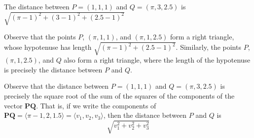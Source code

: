 \begin{example}
    The distance between $P = (1,1,1)$ and $Q = (\pi, 3, 2.5)$  is $\sqrt{(\pi-1)^2+ (3-1)^2 + (2.5-1)^2}$
    
    \begin{center}
        \end{center}

Observe that the points $P$, $(\pi, 1, 1)$, and $(\pi, 1, 2.5)$ form a right triangle, whose hypotenuse has length $\sqrt{(\pi-1)^2+(2.5-1)^2}$. Similarly, the points $P$, $(\pi, 1, 2.5)$, and $Q$ also form a right triangle, where the length of the hypotenuse is precisely the distance between $P$ and $Q$.

    
\end{example}

Observe that the distance between $P = (1,1,1)$ and $Q = (\pi, 3, 2.5)$  is precisely the square root of the sum of the squares of the components of the vector $\bm{PQ}$. That is, if we write the components of $\bm{PQ} = \langle \pi-1, 2, 1.5 \rangle = \langle v_1, v_2, v_3 \rangle$, then the distance between $P$ and $Q$ is $$\sqrt{v_1^2 + v_2^2 + v_3^2}$$  


